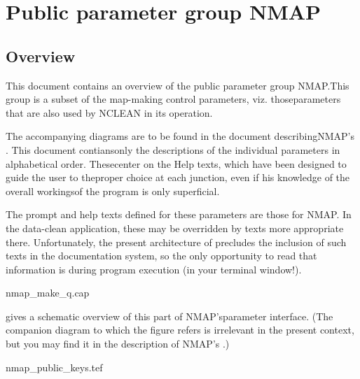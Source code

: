 %

\chapter{ Public parameter group NMAP}
\tableofcontents


\section{ Overview}
\label{.overview}

        This document contains an overview of the public parameter group
NMAP.This group is a subset of the map-making control parameters, viz.
thoseparameters that are also used by NCLEAN in its
 operation.

        The accompanying diagrams are to be found in the document
describingNMAP's . This
document contiansonly the descriptions of the individual parameters in
alphabetical order. Thesecenter on the Help texts, which have been designed to
guide the user to theproper choice at each junction, even if his knowledge of
the overall workingsof the program is only superficial.

        The prompt and help texts defined for these parameters are those
for NMAP. In the data-clean application, these may be overridden by texts more
appropriate there. Unfortunately, the present architecture of
\NEWSTAR precludes the inclusion of such texts in the documentation system,
so the only opportunity to read that information is during program execution
(in your terminal window!).

 {nmap_make_q.cap}

         gives a schematic overview of this part of
NMAP'sparameter interface. (The companion diagram to which the figure refers is
irrelevant in the present context, but you may find it in the description of
NMAP's  .)

 {nmap_public_keys.tef}


\label{.nmap.make}      %
